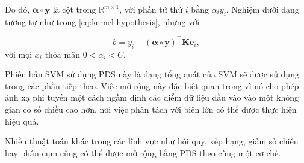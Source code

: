 Do đó, $\boldsymbol{\alpha}\circ\mathbf{y}$ là  cột trong
$\mathbb{R}^{m\times1}$, với phần tử thứ $i$ bằng $\alpha_i y_i$.
Nghiệm dưới dạng  tương tự như trong
\eqref{eq:kernel-hypothesis}, nhưng với

\begin{equation}
b = y_i - (\boldsymbol{\alpha}\circ\mathbf{y})^{\intercal}
\mathbf{K}\mathbf{e}_i,
\end{equation}
với mọi $x_i$ thỏa mãn $0 < \alpha_i < C$.

Phiên bản SVM sử dụng \protect{} PDS này là dạng tổng quát
của SVM sẽ được sử dụng trong các phần tiếp theo. Việc mở rộng này đặc
biệt quan trọng vì nó cho phép ánh xạ phi tuyến một cách ngầm định các
điểm dữ liệu đầu vào vào một không gian có số chiều cao hơn, nơi việc
phân tách với biên lớn có thể được thực hiện hiệu quả.

Nhiều thuật toán khác trong các lĩnh vực như hồi quy, xếp hạng,
giảm số chiều hay phân cụm cũng có thể được mở rộng bằng
\protect{} PDS theo cùng một cơ chế.
